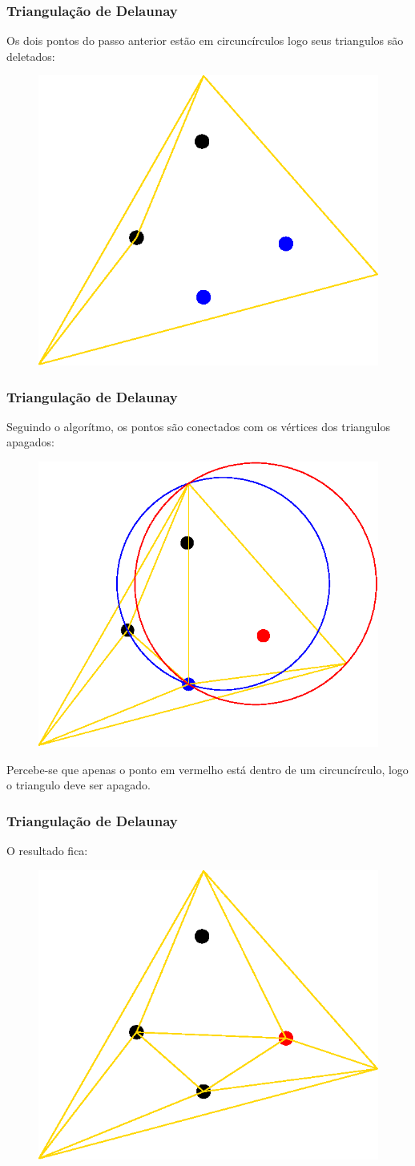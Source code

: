 \documentclass[brazil]{beamer}
\begin{document}
\begin{frame}
  \frametitle{Triangulação de Delaunay}

  Os dois pontos do passo anterior estão em circuncírculos logo seus triangulos são deletados:

  \begin{figure}
    \includegraphics[width=0.5\linewidth]{dela9.eps}
  \end{figure}
\end{frame}

\begin{frame}
  \frametitle{Triangulação de Delaunay}

  Seguindo o algorítmo, os pontos são conectados com os vértices dos triangulos apagados:

  \begin{figure}
    \includegraphics[width=0.5\linewidth]{dela10.eps}
  \end{figure}
  Percebe-se que apenas o ponto em vermelho está dentro de um circuncírculo, logo o triangulo deve ser apagado.
\end{frame}

\begin{frame}
  \frametitle{Triangulação de Delaunay}
  O resultado fica:

  \begin{figure}
    \includegraphics[width=0.5\linewidth]{dela11.eps}
  \end{figure}
\end{frame}
\end{document}
